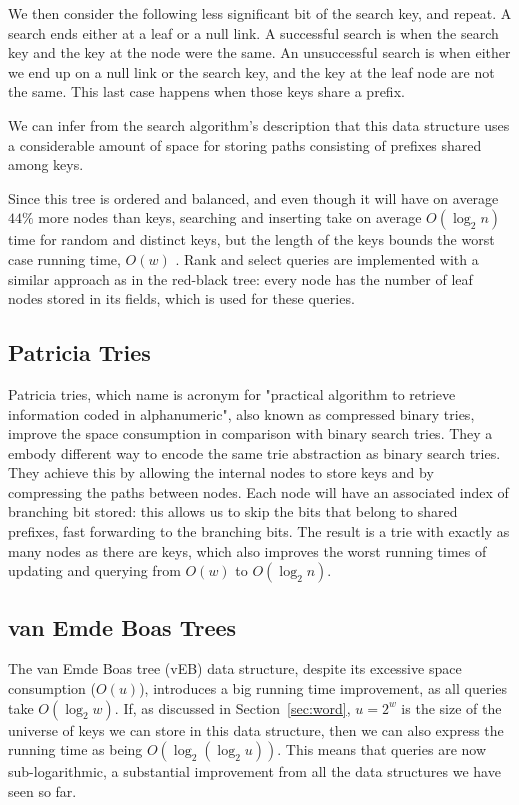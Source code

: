 We then consider the following less significant bit of the search key, and repeat. A search ends either at a leaf or a null link. A successful search is when the search key and the key at the node were the same. An unsuccessful search is when either we end up on a null link or the search key, and the key at the leaf node are not the same. This last case happens when those keys share a prefix.

We can infer from the search algorithm's description that this data structure uses a considerable amount of space for storing paths consisting of prefixes shared among keys.

Since this tree is ordered and balanced, and even though it will have on average $44\%$ more nodes than keys, searching and inserting take on average $O(\log_2 n)$ time for random and distinct keys, but the length of the keys bounds the worst case running time, $O(w)$ \cite{sedgewick2002algorithms}. Rank and select queries are implemented with a similar approach as in the red-black tree: every node has the number of leaf nodes stored in its fields, which is used for these queries.

\subsection{Patricia Tries}

Patricia tries, which name is acronym for "practical algorithm to retrieve information coded in alphanumeric", also known as compressed binary tries, improve the space consumption in comparison with binary search tries.
They a embody different way to encode the same trie abstraction as binary search tries.
They achieve this by allowing the internal nodes to store keys and by compressing the paths between nodes.
Each node will have an associated index of branching bit stored: this allows us to skip the bits that belong to shared prefixes, fast forwarding to the branching bits.
The result is a trie with exactly as many nodes as there are keys, which also improves the worst running times of updating and querying from $O(w)$ to $O(\log_2 n)$.

\subsection{van Emde Boas Trees}

The van Emde Boas tree (vEB) data structure, despite its excessive space consumption ($O(u)$), introduces a big running time improvement, as all queries take $O(\log_2 w)$.
If, as discussed in Section~\ref{sec:word}, $u = 2^w$ is the size of the universe of keys we can store in this data structure, then we can also express the running time as being $O(\log_2(\log_2 u))$.
This means that queries are now sub-logarithmic, a substantial improvement from all the data structures we have seen so far.

